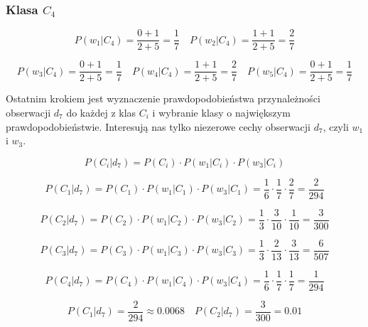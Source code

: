 \documentclass{article}
\begin{document}
\subsubsection*{Klasa $C_4$}

\begin{equation*}
    P(w_1|C_4) = \frac{0 + 1}{2 + 5} = \frac{1}{7} \quad P(w_2|C_4) = \frac{1 + 1}{2 + 5} = \frac{2}{7}
\end{equation*}

\begin{equation*}
    P(w_3|C_4) = \frac{0 + 1}{2 + 5} = \frac{1}{7} \quad P(w_4|C_4) = \frac{1 + 1}{2 + 5} = \frac{2}{7} \quad P(w_5|C_4) = \frac{0 + 1}{2 + 5} = \frac{1}{7}
\end{equation*}

Ostatnim krokiem jest wyznaczenie prawdopodobieństwa przynależności obserwacji $d_7$
do każdej z klas $C_i$ i wybranie klasy o największym prawdopodobieństwie.
Interesują nas tylko niezerowe cechy obserwacji $d_7$, czyli $w_1$ i $w_3$.

\begin{equation}
    P(C_i|d_7) = P(C_i) \cdot P(w_1|C_i) \cdot P(w_3|C_i)
    \label{eq:eq2}
\end{equation}

\begin{equation*}
    P(C_1|d_7) = P(C_1) \cdot P(w_1|C_1) \cdot P(w_3|C_1) = \frac{1}{6} \cdot \frac{1}{7} \cdot \frac{2}{7} = \frac{2}{294}
\end{equation*}

\begin{equation*}
    P(C_2|d_7) = P(C_2) \cdot P(w_1|C_2) \cdot P(w_3|C_2) = \frac{1}{3} \cdot \frac{3}{10} \cdot \frac{1}{10} = \frac{3}{300}
\end{equation*}

\begin{equation*}
    P(C_3|d_7) = P(C_3) \cdot P(w_1|C_3) \cdot P(w_3|C_3) = \frac{1}{3} \cdot \frac{2}{13} \cdot \frac{3}{13} = \frac{6}{507}
\end{equation*}

\begin{equation*}
    P(C_4|d_7) = P(C_4) \cdot P(w_1|C_4) \cdot P(w_3|C_4) = \frac{1}{6} \cdot \frac{1}{7} \cdot \frac{1}{7} = \frac{1}{294}
\end{equation*}

\begin{equation*}
    P(C_1|d_7) = \frac{2}{294} \approx 0.0068 \quad P(C_2|d_7) = \frac{3}{300} = 0.01
\end{equation*}
\end{document}
